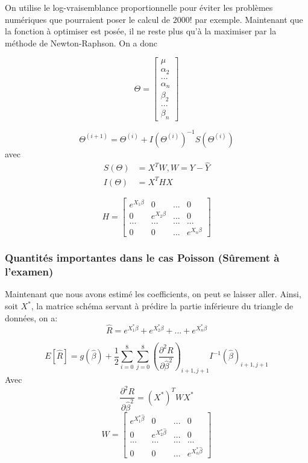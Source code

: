 On utilise le log-vraisemblance proportionnelle pour éviter les problèmes numériques que pourraient poser le calcul de $2000!$ par exemple. 
Maintenant que la fonction à optimiser est posée, il ne reste plus qu'à la maximiser par la méthode de Newton-Raphson. On a donc

\[
\Theta = 
\begin{bmatrix}
\mu \\
\alpha_2 \\
... \\
\alpha_n \\
\beta_2 \\
... \\
\beta_n
\end{bmatrix}
\]

$$\boxed{\Theta^{(i+1)}=\Theta^{(i)}+I(\Theta^{(i)})^{-1}S(\Theta^{(i)})}$$
avec
$$\boxed{\begin{aligned}
S(\Theta) &= X^T W,W=Y-\widehat Y \\
I(\Theta) &=X^T H X
\end{aligned}}$$

\[
H = 
\begin{bmatrix}
e^{X_1 \beta} & 0 & ... & 0 \\
0 & e^{X_2 \beta} & ... & 0 \\
... & ... & ... & ... \\
0 & 0 & ... & e^{X_n \beta}
\end{bmatrix}
\]

\subsubsection*{Quantités importantes dans le cas Poisson (Sûrement à l'examen)}

Maintenant que nous avons estimé les coefficients, on peut se laisser aller. Ainsi, soit $X^*$, la matrice schéma servant à prédire la partie inférieure du triangle de données, on a:
$$\widehat{R}=e^{X_1^* \beta}+e^{X_2^* \beta}+...+e^{X_n^* \beta}$$

$$\boxed{E[\widehat{R}]  = g(\widehat{\beta}) + \frac{1}{2} \sum_{i=0}^8 \sum_{j=0}^8 \left(\frac{\partial^2 R}{\partial \widehat{\beta}^2}  \right)_{i+1,j+1} I^{-1}(\widehat{\beta})_{i+1,j+1}}$$
Avec
$$\frac{\partial^2 R}{\partial \widehat{\beta}^2}=(X^*)^T W X^*$$
\[
W = 
\begin{bmatrix}
e^{X_1^* \widehat{\beta}} & 0 & ... & 0 \\
0 & e^{X_2^* \widehat{\beta}}  & ... & 0 \\
... & ... & ... & ... \\
0 & 0 & ... & e^{X_n^* \widehat{\beta}}
\end{bmatrix}
\]

